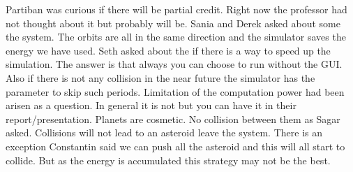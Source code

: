 Partiban was curious if there will be partial credit. Right now the professor had not thought about it but probably will be.
Sania and Derek asked about some the system. The orbits are all in the same direction and the simulator saves the energy we have used.
Seth asked about the if there is a way to speed up the simulation. The answer is 
that always you can choose to run without the GUI. Also if there is not any 
collision in the near future the simulator has the parameter to skip such periods.
Limitation of the computation power had been arisen as a question. In general it is not but you can have it in their report/presentation.
Planets are cosmetic. No collision between them as Sagar asked.
Collisions will not lead to an asteroid leave the system. There is an exception 
Constantin said we can push all the asteroid and this will all start to collide. But as the energy is accumulated this strategy may not be the best.

